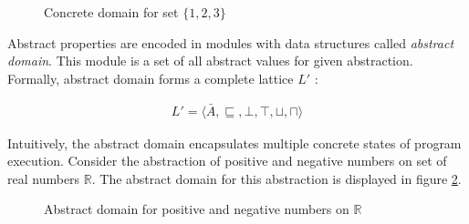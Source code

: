 \documentclass[12pt,final,oneside]{fithesis2}
\theoremstyle{definition}
\begin{document}
\begin{figure}[h]
\centering
{}
\caption{Concrete domain for set $\{ 1, 2, 3 \}$}
\label{fig:concretedomain}
\end{figure}

Abstract properties are encoded in modules with data structures called
\textit{abstract domain}. This module is a set of all abstract values
for given abstraction. Formally, abstract domain forms a complete
lattice $L'$ \cite{Constantini11-1}:

\begin{align*}
L' = \langle \bar{A}, \sqsubseteq, \bot, \top, \sqcup, \sqcap  \rangle
\end{align*}

Intuitively, the abstract domain encapsulates multiple concrete states of
program execution. Consider the abstraction of positive and negative numbers on set of real
numbers $\mathbb{R}$. The abstract domain for this abstraction is displayed
in figure \ref{fig:abstractdomain}.

\begin{figure}[h]
\centering
{}
\caption{Abstract domain for positive and negative numbers on $\mathbb{R}$}
\label{fig:abstractdomain}
\end{figure}
\end{document}
